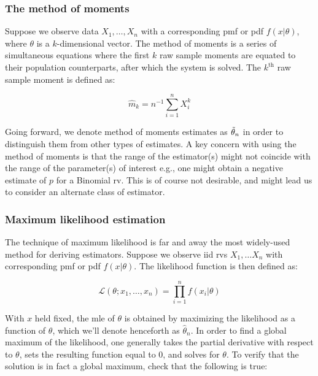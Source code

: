 \documentclass{report}
\begin{document}
\subsubsection{The method of moments}

Suppose we observe data $X_1, \dots, X_n$ with a corresponding \gls{pmf} or \gls{pdf} $f(x|\theta)$, where $\theta$ is a $k$-dimensional vector. The method of moments is a series of simultaneous equations where the first $k$ raw sample moments are equated to their population counterparts, after which the system is solved. The $k^{\text{th}}$ raw sample moment is defined as:

\begin{equation}\label{eq:kth-sample-moment}
    \hat{m}_k = n^{-1} \sum_{i=1}^n X_i^k
\end{equation}

Going forward, we denote method of moments estimates as $\Tilde{\theta}_n$ in order to distinguish them from other types of estimates. A key concern with using the method of moments is that the range of the estimator(s) might not coincide with the range of the parameter(s) of interest e.g., one might obtain a negative estimate of $p$ for a Binomial \gls{rv}. This is of course not desirable, and might lead us to consider an alternate class of estimator. 

\subsubsection{Maximum likelihood estimation}

The technique of maximum likelihood is far and away the most widely-used method for deriving estimators. Suppose we observe \gls{iid} \glspl{rv} $X_1, \dots X_n$ with corresponding \gls{pmf} or \gls{pdf} $f(x|\theta)$. The likelihood function is then defined as:

\begin{equation}\label{eq:likelihood-function-of-theta}
    \mathcal{L}(\theta; x_1, \dots, x_n) = \prod_{i=1}^n f(x_i|\theta)
\end{equation}

With $x$ held fixed, the \gls{mle} of $\theta$ is obtained by maximizing the likelihood as a function of $\theta$, which we'll denote henceforth as $\hat{\theta}_n$. In order to find a global maximum of the likelihood, one generally takes the partial derivative with respect to $\theta$, sets the resulting function equal to 0, and solves for $\theta$. To verify that the solution is in fact a global maximum, check that the following is true:
\end{document}
